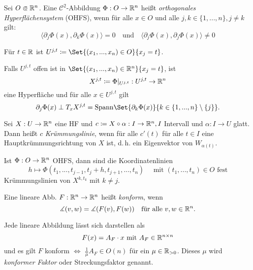 \documentclass{cheat-sheet}
\begin{document}
\begin{defn}
  Sei $O \opn \R^n$. Eine $\mathcal{C}^2$-Abbildung $\Phi : O \to \mathbb{R}^n$ heißt \emph{orthogonales Hyperflächensystem} (OHFS), wenn für alle $x \in O$ und alle $j, k \in \{ 1, ..., n \}, j \not= k$ gilt:
  \[
    \langle \partial_j \Phi(x), \partial_k \Phi(x) \rangle = 0
    \quad \text{und} \quad
    \langle \partial_j \Phi(x), \partial_j \Phi(x) \rangle \not= 0
  \]
\end{defn}

\begin{nota}
  Für $t \in \mathbb{R}$ ist $U^{j,t} \coloneqq \Set{ (x_1, ..., x_n) \in O }{ x_j = t }$.
\end{nota}

\begin{bem}
  Falls $U^{j,t}$ offen ist in $\Set{ (x_1, ..., x_n) \in \R^n }{ x_j = t }$, ist
  \[ X^{j,t} \coloneqq \Phi|_{U^{j,t}} : U^{j,t} \to \mathbb{R}^n \]
  eine Hyperfläche und für alle $x \in U^{j,t}$ gilt
  \[ \partial_j \Phi(x) \perp T_x X^{j,t} = \mathrm{Spann} \Set{ \partial_k \Phi(x) }{ k \in \{ 1, ..., n \} \setminus \{ j \} }. \]
\end{bem}

\begin{defn}
  Sei $X : U \to \mathbb{R}^n$ eine HF und $c \coloneqq X \circ \alpha : I \to \mathbb{R}^n, I$ Intervall und $\alpha : I \to U$ glatt. Dann heißt $c$ \emph{Krümmungslinie}, wenn für alle $c'(t)$ für alle $t \in I$ eine Hauptkrümmungsrichtung von $X$ ist, d.\,h. ein Eigenvektor von $W_{\alpha(t)}$.
\end{defn}


\begin{satz}
  Ist $\Phi : O \to \mathbb{R}^n$ OHFS, dann sind die Koordinatenlinien
  \[ h \mapsto \Phi(t_1, ..., t_{j-1}, t_j + h, t_{j+1}, ..., t_n) \quad \text{ mit } (t_1, ..., t_n) \in O \text{ fest} \]
  Krümmungslinien von $X^{k, t_k}$ mit $k \not= j$.
\end{satz}

\begin{defn}
  Eine lineare Abb. $F : \mathbb{R}^n \to \mathbb{R}^n$ heißt \emph{konform}, wenn
  \[ \measuredangle (v, w) = \measuredangle (F(v), F(w)) \quad \text{für alle } v, w \in \mathbb{R}^n. \]
\end{defn}

\begin{bem}
  Jede lineare Abbildung lässt sich darstellen als
  \[ F(x) = A_F \cdot x \text{ mit } A_F \in \mathbb{R}^{n \times n} \]
  und es gilt $F$ konform $\iff$ $\tfrac{1}{\mu} A_F \in O(n)$ für ein $\mu \in \mathbb{R}_{> 0}$. Dieses $\mu$ wird \emph{konformer Faktor} oder Streckungsfaktor genannt.
\end{bem}
\end{document}
